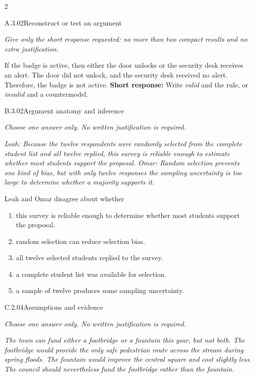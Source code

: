 \documentclass[9pt]{extarticle}
\newcommand{\choice}[1]{\item #1}
\begin{document}
\CoreWorkArea
\FormBreak
{}
\begin{multicols}{2}
\begin{DenseCoreProblem}{A.3.02}{Reconstruct or test an argument}
{\scriptsize\textit{Give only the short response requested: no more than two compact results and no extra justification.}\par}
If the badge is active, then either the door unlocks or the security desk receives an alert. The door did not unlock, and the security desk received no alert. Therefore, the badge is not active.
\textbf{Short response:} Write \emph{valid} and the rule, or \emph{invalid} and a countermodel.
\end{DenseCoreProblem}
\begin{DenseCoreProblem}{B.3.02}{Argument anatomy and inference}
{\scriptsize\textit{Choose one answer only. No written justification is required.}\par}
\emph{Leah: Because the twelve respondents were randomly selected from the complete student list and all twelve replied, this survey is reliable enough to estimate whether most students support the proposal. Omar: Random selection prevents one kind of bias, but with only twelve responses the sampling uncertainty is too large to determine whether a majority supports it.}

Leah and Omar disagree about whether
\begin{enumerate}[label=(\alph*)]
  \choice{this survey is reliable enough to determine whether most students support the proposal.}
  \choice{random selection can reduce selection bias.}
  \choice{all twelve selected students replied to the survey.}
  \choice{a complete student list was available for selection.}
  \choice{a sample of twelve produces some sampling uncertainty.}
\end{enumerate}
\end{DenseCoreProblem}
\columnbreak
\begin{DenseCoreProblem}{C.2.04}{Assumptions and evidence}
{\scriptsize\textit{Choose one answer only. No written justification is required.}\par}
\emph{The town can fund either a footbridge or a fountain this year, but not both. The footbridge would provide the only safe pedestrian route across the stream during spring floods. The fountain would improve the central square and cost slightly less. The council should nevertheless fund the footbridge rather than the fountain.}


\end{DenseCoreProblem}
\end{multicols}
\end{document}
